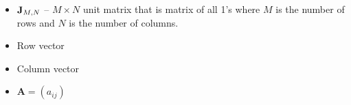 ﻿\begin{itemize}
    \item ${\mathbf{J}} \sb{M, N}$ -- $M \times N$ unit matrix that is matrix of all 1's
    where $M$ is the number of rows and $N$ is the number of columns.
    \item Row vector
    \item Column vector
    \item $\mathbf{A} = (a_{ij})$
\end{itemize}
